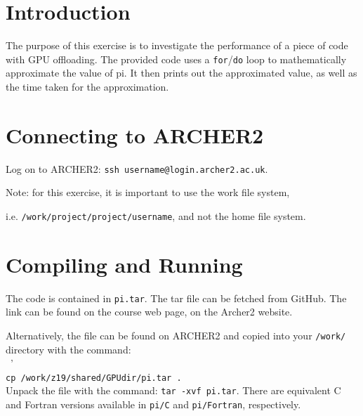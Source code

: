 

\maketitle

\section{Introduction}

The purpose of this exercise is to investigate the performance of a piece of code with GPU offloading. The provided code uses a \texttt{for}/\texttt{do} loop to mathematically approximate the value of pi. It then prints out the approximated value, as well as the time taken for the approximation. 
 


\section{Connecting to ARCHER2}

Log on to ARCHER2: \texttt{ssh username@login.archer2.ac.uk}. 

\noindent Note: for this exercise, it is important to use the work file system, 

\noindent i.e. \texttt{/work/project/project/username}, and not the home file system.



\section{Compiling and Running}

The code is contained in \texttt{pi.tar}. The tar file can be fetched from GitHub. The link can be found on the course web page, on the Archer2 website.

\noindent Alternatively, the file can be found on ARCHER2 and copied into your \texttt{/work/} directory with the command:
\\~'\\
\indent\texttt{cp /work/z19/shared/GPUdir/pi.tar .} \\

\noindent Unpack the file with the command: \texttt{tar -xvf pi.tar}. There are equivalent C and Fortran versions available in \texttt{pi/C} and \texttt{pi/Fortran}, respectively.\\

